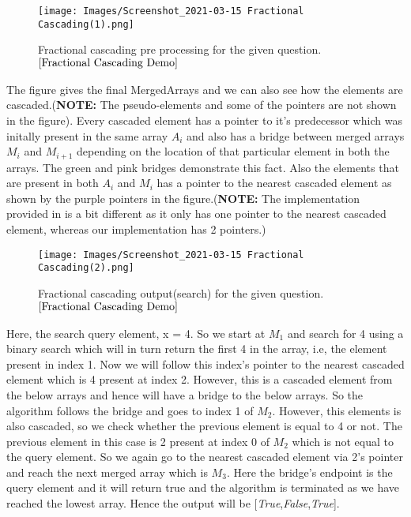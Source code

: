 \documentclass[11pt]{article}
\begin{document}
\begin{figure}[!h]
    \centering
    \texttt{[image: Images/Screenshot\_2021-03-15 Fractional Cascading(1).png]}
    \caption{Fractional cascading pre processing for the given question.$^{\cite{Fractional Cascading Demo}}$}
    \label{fig:label}
\end{figure}
    


The figure gives the final MergedArrays and we can also see how the elements are cascaded.(\textbf{NOTE:} The pseudo-elements and some of the pointers are not shown in the figure). Every cascaded element has a pointer to it's predecessor which was initally present in the same array $A_i$ and also has a bridge between merged arrays $M_i$ and $M_{i+1}$ depending on the location of that particular element in both the arrays. The green and pink bridges demonstrate this fact. Also the elements that are present in both $A_i$ and $M_i$ has a pointer to the nearest cascaded element as shown by the purple pointers in the figure.(\textbf{NOTE:} The implementation provided in \cite{Fractional Cascading Demo} is a bit different as it only has one pointer to the nearest cascaded element, whereas our implementation has 2 pointers.) 



\begin{figure}[H]
    \centering
    \texttt{[image: Images/Screenshot\_2021-03-15 Fractional Cascading(2).png]}
    \caption{Fractional cascading output(search) for the given question.$^{\cite{Fractional Cascading Demo}}$}
    \label{fig:label}
\end{figure}

Here, the search query element, x = 4. So we start at $M_1$ and search for 4 using a binary search which will in turn return the first 4 in the array, i.e, the element present in index 1. Now we will follow this index's pointer to the nearest cascaded element which is 4 present at index 2. However, this is a cascaded element from the below arrays and hence will have a bridge to the below arrays. So the algorithm follows the bridge and goes to index 1 of $M_2$. However, this elements is also cascaded, so we check whether the previous element is equal to 4 or not. The previous element in this case is 2 present at index 0 of $M_2$ which is not equal to the query element. So we again go to the nearest cascaded element via 2's pointer and reach the next merged array which is $M_3$. Here the bridge's endpoint is the query element and it will return true and the algorithm is terminated as we have reached the lowest array. Hence the output will be [\textit{True},\textit{False},\textit{True}].
\end{document}
